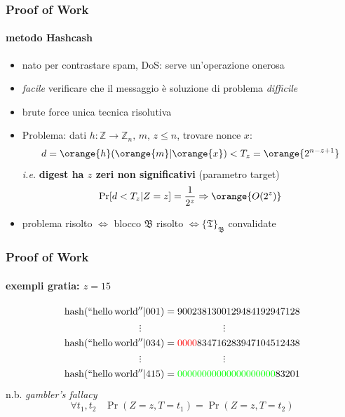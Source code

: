 \begin{frame}
	\frametitle{Proof of Work}
	\framesubtitle{metodo Hashcash}
	
	\begin{itemize}
	  \item nato per contrastare spam, DoS: serve un'operazione onerosa
	  \item \textit{facile} verificare che il messaggio è soluzione di problema \textit{difficile}
	  \item {\color{blue}brute force} unica tecnica risolutiva 
	  \item Problema: dati $h:\mathbb{Z}\rightarrow\mathbb{Z}_n,\,m,\,z \leq n$, trovare nonce $x:$
	  		$$d=\orange{h}(\orange{m}|\orange{x}) < T_z = \orange{2^{n-z+1}}$$
	   		\textit{i.e.} \textbf{digest ha $z$ zeri non significativi} (parametro {\color{blue}target})
	  		$$\Pr[d<T_z|Z=z]=\frac{1}{2^z} \Rightarrow \orange{O(2^z)}$$ %
	  \item problema risolto $\Leftrightarrow$ blocco $\mathfrak{B}$ risolto $\Leftrightarrow \{\mathfrak{T}\}_\mathfrak{B}$ convalidate  
	  \end{itemize}
\end{frame}
\begin{frame}
	\frametitle{Proof of Work}
	\framesubtitle{exempli gratia: $z=15$}	
	 
	$$ \mathrm{hash}(\mathrm{``hello\,world''}|001)=              9002381300129484192947128  $$
	$$ \vdots \;\;\;\;\;\;\;\;\;\;\;\;\;\;\;\;\;\;\;\;\;\;\;\;\;\;\;\;\;\; \vdots$$
	$$ \mathrm{hash}(\mathrm{``hello\,world''}|034)={\color{red}0000}834716283947104512438 $$
	$$ \vdots \;\;\;\;\;\;\;\;\;\;\;\;\;\;\;\;\;\;\;\;\;\;\;\;\;\;\;\;\;\; \vdots$$
	$$ \mathrm{hash}(\mathrm{``hello\,world''}|415)={\color{green}00000000000000000000}83201 $$
	\newline
	{\color{blue}n.b.} \textit{gambler's fallacy}
	$$\forall t_1,t_2 \;\;\; \Pr(Z=z, T=t_1)=\Pr(Z=z, T=t_2)$$

\end{frame}
